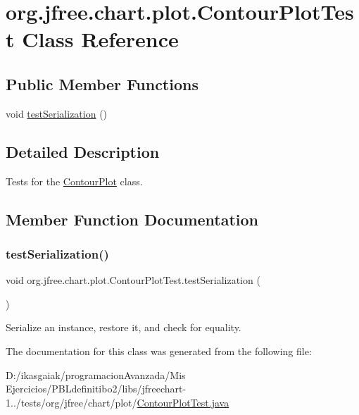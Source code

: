 \hypertarget{classorg_1_1jfree_1_1chart_1_1plot_1_1_contour_plot_test}{}\section{org.\+jfree.\+chart.\+plot.\+Contour\+Plot\+Test Class Reference}
\label{classorg_1_1jfree_1_1chart_1_1plot_1_1_contour_plot_test}
\subsection*{Public Member Functions}
\begin{DoxyCompactItemize}
\item 
void \mbox{\hyperlink{classorg_1_1jfree_1_1chart_1_1plot_1_1_contour_plot_test_a95c122fc88d75db1144ffb0343d9594f}{test\+Serialization}} ()
\end{DoxyCompactItemize}


\subsection{Detailed Description}
Tests for the {\ttfamily \mbox{\hyperlink{classorg_1_1jfree_1_1chart_1_1plot_1_1_contour_plot}{Contour\+Plot}}} class. 

\subsection{Member Function Documentation}
\mbox{\label{classorg_1_1jfree_1_1chart_1_1plot_1_1_contour_plot_test_a95c122fc88d75db1144ffb0343d9594f}} 
\subsubsection{\texorpdfstring{test\+Serialization()}{testSerialization()}}
{\footnotesize\ttfamily void org.\+jfree.\+chart.\+plot.\+Contour\+Plot\+Test.\+test\+Serialization (\begin{DoxyParamCaption}{ }\end{DoxyParamCaption})}

Serialize an instance, restore it, and check for equality. 

The documentation for this class was generated from the following file\+:\begin{DoxyCompactItemize}
\item 
D\+:/ikasgaiak/programacion\+Avanzada/\+Mis Ejercicios/\+P\+B\+Ldefinitibo2/libs/jfreechart-\/1../tests/org/jfree/chart/plot/\mbox{\hyperlink{_contour_plot_test_8java}{Contour\+Plot\+Test.\+java}}\end{DoxyCompactItemize}
